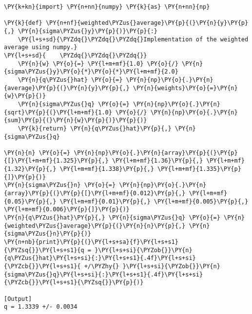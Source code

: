 \begin{Verbatim}[label=\makebox{\href{https://bitbucket.org/lbaldini/statnotes/src/master/snippets/weighted\_average.py}{https://bitbucket.org/.../weighted\_average.py}},commandchars=\\\{\}]
\PY{k+kn}{import} \PY{n+nn}{numpy} \PY{k}{as} \PY{n+nn}{np}

\PY{k}{def} \PY{n+nf}{weighted\PYZus{}average}\PY{p}{(}\PY{n}{y}\PY{p}{,} \PY{n}{sigma\PYZus{}y}\PY{p}{)}\PY{p}{:}
    \PY{l+s+sd}{\PYZdq{}\PYZdq{}\PYZdq{}Implementation of the weighted average using numpy.}
\PY{l+s+sd}{    \PYZdq{}\PYZdq{}\PYZdq{}}
    \PY{n}{w} \PY{o}{=} \PY{l+m+mf}{1.0} \PY{o}{/} \PY{n}{sigma\PYZus{}y}\PY{o}{*}\PY{o}{*}\PY{l+m+mf}{2.0}
    \PY{n}{q\PYZus{}hat} \PY{o}{=} \PY{n}{np}\PY{o}{.}\PY{n}{average}\PY{p}{(}\PY{n}{y}\PY{p}{,} \PY{n}{weights}\PY{o}{=}\PY{n}{w}\PY{p}{)}
    \PY{n}{sigma\PYZus{}q} \PY{o}{=} \PY{n}{np}\PY{o}{.}\PY{n}{sqrt}\PY{p}{(}\PY{l+m+mf}{1.0} \PY{o}{/} \PY{n}{np}\PY{o}{.}\PY{n}{sum}\PY{p}{(}\PY{n}{w}\PY{p}{)}\PY{p}{)}
    \PY{k}{return} \PY{n}{q\PYZus{}hat}\PY{p}{,} \PY{n}{sigma\PYZus{}q}

\PY{n}{n} \PY{o}{=} \PY{n}{np}\PY{o}{.}\PY{n}{array}\PY{p}{(}\PY{p}{[}\PY{l+m+mf}{1.325}\PY{p}{,} \PY{l+m+mf}{1.36}\PY{p}{,} \PY{l+m+mf}{1.32}\PY{p}{,} \PY{l+m+mf}{1.338}\PY{p}{,} \PY{l+m+mf}{1.335}\PY{p}{]}\PY{p}{)}
\PY{n}{sigma\PYZus{}n} \PY{o}{=} \PY{n}{np}\PY{o}{.}\PY{n}{array}\PY{p}{(}\PY{p}{[}\PY{l+m+mf}{0.012}\PY{p}{,} \PY{l+m+mf}{0.05}\PY{p}{,} \PY{l+m+mf}{0.01}\PY{p}{,} \PY{l+m+mf}{0.005}\PY{p}{,} \PY{l+m+mf}{0.006}\PY{p}{]}\PY{p}{)}
\PY{n}{q\PYZus{}hat}\PY{p}{,} \PY{n}{sigma\PYZus{}q} \PY{o}{=} \PY{n}{weighted\PYZus{}average}\PY{p}{(}\PY{n}{n}\PY{p}{,} \PY{n}{sigma\PYZus{}n}\PY{p}{)}
\PY{n+nb}{print}\PY{p}{(}\PY{l+s+sa}{f}\PY{l+s+s1}{\PYZsq{}}\PY{l+s+s1}{q = }\PY{l+s+si}{\PYZob{}}\PY{n}{q\PYZus{}hat}\PY{l+s+si}{:}\PY{l+s+s1}{.4f}\PY{l+s+si}{\PYZcb{}}\PY{l+s+s1}{ +/\PYZhy{} }\PY{l+s+si}{\PYZob{}}\PY{n}{sigma\PYZus{}q}\PY{l+s+si}{:}\PY{l+s+s1}{.4f}\PY{l+s+si}{\PYZcb{}}\PY{l+s+s1}{\PYZsq{}}\PY{p}{)}

[Output]
q = 1.3339 +/- 0.0034
\end{Verbatim}